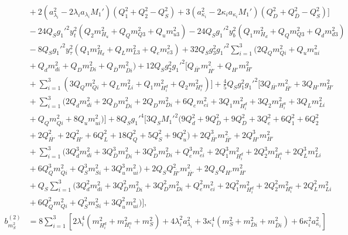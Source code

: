 \documentclass[preprint,amsmath,amssymb,aps,superscriptaddress,prd,showpacs,floatfix,nofootinbib]{revtex4-1}
\begin{document}
\begin{subequations}
\begin{align}
&{}+2\left ( a_{\lambda_i}^2-2\lambda_ia_{\lambda_i}M_1'\right )\left ( Q_1^2+Q_2^2-Q_S^2\right )+3\left ( a_{\kappa_i}^2-2\kappa_ia_{\kappa_i}M_1'\right )\left ( Q_D^2+Q_{\overline{D}}^2-Q_S^2\right )\bigg ]\nonumber\\
&{}-24Q_Sg_1'^2y_t^2\left ( Q_2m_{H_u}^2+Q_Qm_{Q3}^2+Q_um_{u3}^2\right )-24Q_Sg_1'^2y_b^2\left ( Q_1m_{H_d}^2+Q_Qm_{Q3}^2+Q_dm_{d3}^2\right )\nonumber\\
&{}-8Q_Sg_1'^2y_\tau^2\left ( Q_1m_{H_d}^2+Q_Lm_{L3}^2+Q_em_{e3}^2\right )+32Q_Sg_3^2g_1'^2\sum_{i=1}^3\big ( 2Q_Qm_{Qi}^2+Q_um_{ui}^2\nonumber\\
&{}+Q_dm_{di}^2+Q_Dm_{Di}^2+Q_{\overline{D}}m_{\overline{D}i}^2\big )+12Q_Sg_2^2g_1'^2\bigg [ Q_{\overline{H'}}m_{\overline{H'}}^2+Q_{H'}m_{H'}^2\nonumber\\
&{}+\sum_{i=1}^3\left ( 3Q_Qm_{Qi}^2+Q_Lm_{Li}^2+Q_1m_{H_i^d}^2+Q_2m_{H_i^u}^2\right )\bigg ]+\frac{4}{5}Q_Sg_1^2g_1'^2\bigg [ 3Q_{\overline{H'}}m_{\overline{H'}}^2+3Q_{H'}m_{H'}^2\nonumber\\
&{}+\sum_{i=1}^3\big ( 2Q_dm_{di}^2+2Q_{\overline{D}}m_{\overline{D}i}^2+2Q_Dm_{Di}^2+6Q_em_{ei}^2+3Q_1m_{H_i^d}^2+3Q_2m_{H_i^u}^2+3Q_Lm_{Li}^2\nonumber\\
&{}+Q_Qm_{Qi}^2+8Q_um_{ui}^2\big )\bigg ]+8Q_Sg_1'^4\bigg [ 3Q_SM_1'^2\big ( 9Q_d^2+9Q_{\overline{D}}^2+9Q_D^2+3Q_e^2+6Q_1^2+6Q_2^2\nonumber\\
&{}+2Q_{\overline{H'}}^2+2Q_{H'}^2+6Q_L^2+18Q_Q^2+5Q_S^2+9Q_u^2\big )+2Q_{\overline{H'}}^3m_{\overline{H'}}^2+2Q_{H'}^3m_{H'}^2\nonumber\\
&{}+\sum_{i=1}^3\big ( 3Q_d^3m_{di}^2+3Q_{\overline{D}}^3m_{\overline{D}i}^2+3Q_D^3m_{Di}^2+Q_e^3m_{ei}^2+2Q_1^3m_{H_i^d}^2+2Q_2^3m_{H_i^u}^2+2Q_L^3m_{Li}^2\nonumber\\
&{}+6Q_Q^3m_{Qi}^2+Q_S^3m_{Si}^2+3Q_u^3m_{ui}^2\big )+2Q_SQ_{\overline{H'}}^2m_{\overline{H'}}^2+2Q_SQ_{H'}m_{H'}^2\nonumber\\
&{}+Q_S\sum_{i=1}^3\big ( 3Q_d^2m_{di}^2+3Q_{\overline{D}}^2m_{\overline{D}i}^2+3Q_D^2m_{Di}^2+Q_e^2m_{ei}^2+2Q_1^2m_{H_i^d}^2+2Q_2^2m_{H_i^u}^2+2Q_L^2m_{Li}^2\nonumber\\
&{}+6Q_Q^2m_{Qi}^2+Q_S^2m_{Si}^2+3Q_u^2m_{ui}^2\big )\bigg ],\label{eq:USSMms2BetaTwoLoop}\\
b_{m_S^2}^{(2)}&=8\sum_{i=1}^3\left [ 2\lambda_i^4\left ( m_{H_i^d}^2+m_{H_i^u}^2+m_S^2\right )+4\lambda_i^2a_{\lambda_i}^2 +3\kappa_i^4\left ( m_S^2+m_{Di}^2+m_{\overline{D}i}^2\right )+6\kappa_i^2a_{\kappa_i}^2\right ]\nonumber\\

\end{align}
\end{subequations}
\end{document}
